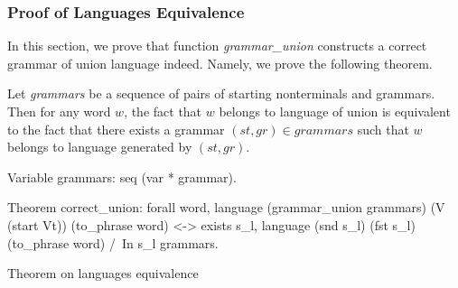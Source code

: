 \subsubsection{Proof of Languages Equivalence}

In this section, we prove that function \textit{grammar\_union} constructs a correct grammar of union language indeed. Namely, we prove the following theorem.

\begin{theorem} \label{theorem-correct-union}
    Let \textit{grammars} be a sequence of pairs of starting nonterminals and grammars. Then for any word $w$, the fact that $w$ belongs to language of union is equivalent to the fact that there exists a grammar $(st,gr) \in \textit{grammars}$ such that $w$ belongs to language generated by $(st,gr)$.
\end{theorem}

\begin{listing}[h]
    \begin{pyglist}[language=coq, numbers=none, numbersep=5pt]
  Variable grammars: seq (var * grammar).

  Theorem correct_union:
    forall word, 
      language (grammar_union grammars) 
        (V (start Vt)) (to_phrase word) <->
      exists s_l, 
        language (snd s_l) (fst s_l) 
          (to_phrase word) /\ 
        In s_l grammars.
    \end{pyglist}
    \caption{Theorem on languages equivalence}
    \label{lst:lang-eq}
\end{listing}


